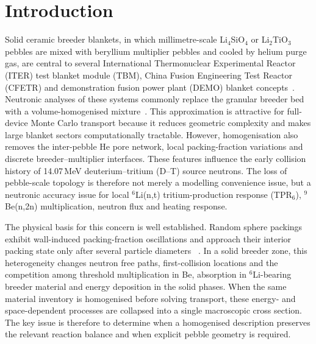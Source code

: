 \documentclass[preprint,12pt]{elsarticle}
\begin{document}
\section{Introduction}

Solid ceramic breeder blankets, in which millimetre-scale Li$_4$SiO$_4$ or
Li$_2$TiO$_3$ pebbles are mixed with beryllium multiplier pebbles and cooled by
helium purge gas, are central to several International Thermonuclear
Experimental Reactor (ITER) test blanket module (TBM), China Fusion Engineering
Test Reactor (CFETR) and demonstration fusion power plant (DEMO) blanket
concepts~\cite{giancarli2018,fischer2015,wang2020}.  Neutronic analyses of
these systems commonly replace the granular breeder bed with a
volume-homogenised mixture~\cite{fischer2015,shen2020,wang2020}.  This
approximation is attractive for full-device Monte Carlo transport because it
reduces geometric complexity and makes large blanket sectors computationally
tractable.  However, homogenisation also removes the inter-pebble He pore
network, local packing-fraction variations and discrete breeder--multiplier
interfaces.  These features influence the early collision history of
14.07\,MeV deuterium--tritium (D--T) source neutrons.  The loss of
pebble-scale topology is therefore not merely a modelling convenience issue,
but a neutronic accuracy issue for local $^6$Li(n,t) tritium-production response (TPR$_6$),
$^9$Be(n,2n) multiplication, neutron flux and heating response.

The physical basis for this concern is well established.  Random sphere
packings exhibit wall-induced packing-fraction oscillations and approach their
interior packing state only after several particle diameters
~\cite{bernal64,jodrey85,gong2017,zhang2022}.  In a solid breeder zone, this
heterogeneity changes neutron free paths, first-collision locations and the
competition among threshold multiplication in Be, absorption in $^6$Li-bearing
breeder material and energy deposition in the solid phases.  When the same
material inventory is homogenised before solving transport, these energy- and
space-dependent processes are collapsed into a single macroscopic cross
section.  The key issue is therefore to determine when a homogenised
description preserves the relevant reaction balance and when explicit pebble
geometry is required.
\end{document}
